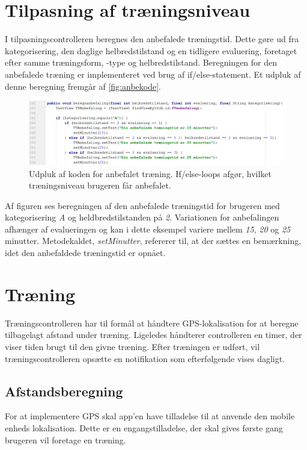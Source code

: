 \section{Tilpasning af træningsniveau}
I tilpasningscontrolleren beregnes den anbefalede træningstid. Dette gøre ud fra kategorisering, den daglige helbredstilstand og en tidligere evaluering, foretaget efter samme træningsform, -type og helbredstilstand.
Beregningen for den anbefalede træning er implementeret ved brug af if/else-statement. Et udpluk af denne beregning fremgår af \autoref{fig:anbekode}.  
   
\begin{figure} [H]
\centering
\includegraphics[width=1\textwidth]{figures/imple/anbekode}
\caption{Udpluk af koden for anbefalet træning. If/else-loops afgør, hvilket træningsniveau brugeren får anbefalet.}
\label{fig:anbekode}
\end{figure} 

\noindent
Af figuren ses beregningen af den anbefalede træningstid for brugeren med kategorisering \textit{A} og heldbredstilstanden på \textit{2}. Variationen for anbefalingen afhænger af evalueringen og kan i dette eksempel variere mellem \textit{15}, \textit{20} og \textit{25}  minutter. Metodekaldet, \textit{setMinutter}, refererer til, at der sættes en bemærkning, idet den anbefaldede træningstid er opnået.

\section{Træning}
Træningscontrolleren har til formål at håndtere GPS-lokalisation for at beregne tilbagelagt afstand under træning. Ligeledes håndterer controlleren en timer, der viser tiden brugt til den givne træning. Efter træningen er udført, vil træningscontrolleren opsætte en notifikation som efterfølgende vises dagligt. 


\subsection{Afstandsberegning}
For at implementere GPS skal app'en have tilladelse til at anvende den mobile enheds lokalisation. Dette er en engangstilladelse, der skal gives første gang brugeren vil foretage en træning. 

